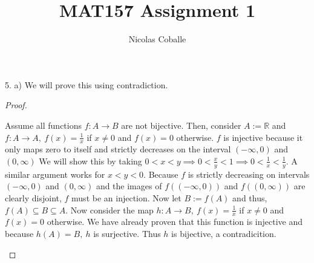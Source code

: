 \documentclass[11pt]{article}
\title{MAT157 Assignment 1}
\author{Nicolas Coballe}
\newcommand{\bproof}{\begin{proof}
$ $ \\
\begin{adjustwidth}{3em}{0pt}
}
\newcommand{\eproof}{\end{adjustwidth}
\end{proof}}
\begin{document}
\maketitle
\begin{flushleft}

5. a) We will prove this using contradiction.

\bproof

Assume all functions $f: A \rightarrow B$ are not bijective. Then, consider $A := \mathbb{R}$ and $f:A \rightarrow A, \ f(x) = \frac{1}{x}$ if $x \neq 0$ and $f(x) = 0$ otherwise. $f$ is injective because it only maps zero to itself and strictly decreases on the interval $(- \infty ,0)$ and $(0, \infty )$ We will show this by taking $0<x<y \implies 0< \frac{x}{y} < 1 \implies 0 < \frac{1}{x} < \frac{1}{y} $. A similar argument works for $x<y<0$. Because $f$ is strictly decreasing on intervals  $(- \infty ,0)$ and $(0, \infty )$ and the images of $f((- \infty ,0) )$ and $f( (0, \infty ))$ are clearly disjoint, $f$ must be an injection. Now let $B := f(A)$ and thus, $f(A) \subseteq B \subseteq A$. Now consider the map $h: A \rightarrow B, \ f(x) = \frac{1}{x}$ if $x \neq 0$ and $f(x) = 0$ otherwise. We have already proven that this function is injective and because $h(A) = B, \  h$ is surjective. Thus $h$ is bijective, a contradicition.

\eproof


\end{flushleft}
\end{document}

